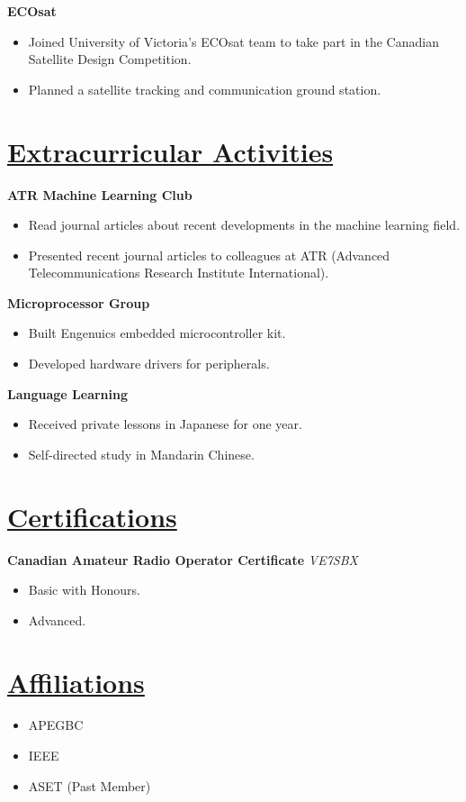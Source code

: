 \documentclass[a4paper, 11pt]{article}
\begin{document}
  \textbf{ECOsat}
  \begin{itemize}[nosep]
    \item Joined University of Victoria's ECOsat team to take part in the Canadian Satellite Design Competition.
    \item Planned a satellite tracking and communication ground station.
  \end{itemize}
  
\section{\underline{Extracurricular Activities}}
  \textbf{ATR Machine Learning Club}
  \begin{itemize}[nosep]
    \item Read journal articles about recent developments in the machine learning field.
    \item Presented recent journal articles to colleagues at ATR (Advanced Telecommunications Research Institute International).
  \end{itemize}
  \medskip
      
  \textbf{Microprocessor Group}
  \begin{itemize}[nosep]
    \item Built Engenuics embedded microcontroller kit.
    \item Developed hardware drivers for peripherals.
  \end{itemize}
  \medskip
      
  \textbf{Language Learning}
  \begin{itemize}[nosep]
    \item Received private lessons in Japanese for one year.
    \item Self-directed study in Mandarin Chinese.
  \end{itemize}

\section{\underline{Certifications}}
  \textbf{Canadian Amateur Radio Operator Certificate}
  \hfill
  \emph{VE7SBX}
  \begin{itemize}[nosep]
    \item Basic with Honours.
    \item Advanced.
  \end{itemize}
      
\section{\underline{Affiliations}}
  \begin{itemize}[nosep]
    \item APEGBC
    \item IEEE
    \item ASET (Past Member)
  \end{itemize}
\end{document}
